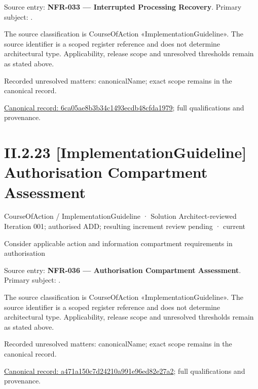 Source entry: \textbf{NFR-033 — Interrupted Processing Recovery}. Primary subject: \texttt{}.



The source classification is CourseOfAction «ImplementationGuideline». The source identifier is a scoped register reference and does not determine architectural type. Applicability, release scope and unresolved thresholds remain as stated above.


{\small Recorded unresolved matters: canonicalName; exact scope remains in the canonical record.}\par
{\footnotesize \href{../../../../continuum/strategy/course-of-action/implementation-guideline/6ca05ae8b3b34c1493ecdb48cfda1979.md}{Canonical record: 6ca05ae8b3b34c1493ecdb48cfda1979}; full qualifications and provenance.}\par
\section*{II.2.23 [ImplementationGuideline] Authorisation Compartment Assessment}
\label{navigation:II.2.23}

\label{element:a471a150c7d24210a991e96ed82e27a2}
{\small CourseOfAction / ImplementationGuideline · Solution Architect-reviewed Iteration 001; authorised ADD; resulting increment review pending · current}\par

Consider applicable action and information compartment requirements in authorisation



Source entry: \textbf{NFR-036 — Authorisation Compartment Assessment}. Primary subject: \texttt{}.



The source classification is CourseOfAction «ImplementationGuideline». The source identifier is a scoped register reference and does not determine architectural type. Applicability, release scope and unresolved thresholds remain as stated above.


{\small Recorded unresolved matters: canonicalName; exact scope remains in the canonical record.}\par
{\footnotesize \href{../../../../continuum/strategy/course-of-action/implementation-guideline/a471a150c7d24210a991e96ed82e27a2.md}{Canonical record: a471a150c7d24210a991e96ed82e27a2}; full qualifications and provenance.}\par
